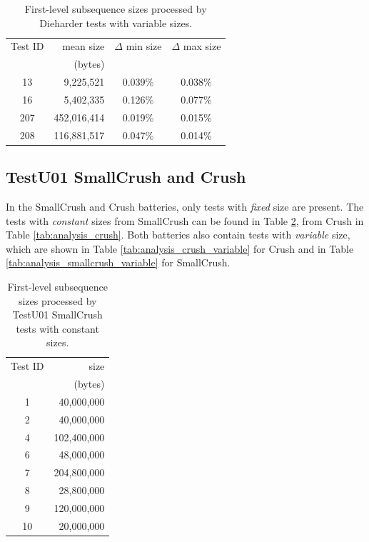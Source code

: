 \documentclass[
  digital,     %
  oneside,     %
  nosansbold,  %
  nocolorbold, %
  nolof,         %
  nolot,         %
]{fithesis4}
\begin{document}
\begin{table}[h]
  \begin{tabularx}{0.7\textwidth}{c|r|c|c}
    Test ID & mean size & $\Delta$ min size & $\Delta$ max size\\
     & (bytes) & & \\
    \midrule
    13 & 9,225,521 & 0.039\% & 0.038\%\\
    16 & 5,402,335 & 0.126\% & 0.077\%\\
    207 & 452,016,414 & 0.019\% & 0.015\%\\
    208 & 116,881,517 & 0.047\% & 0.014\%\\
 
  \end{tabularx}
  \caption{First-level subsequence sizes processed by Dieharder tests with variable sizes.}
  \label{tab:analysis_dieharder_variable}
\end{table}



\subsection{TestU01 SmallCrush and Crush}
In the SmallCrush and Crush batteries, only tests with \emph{fixed} size are present. The tests with \emph{constant} sizes from SmallCrush can be found in Table \ref{tab:analysis_smallcrush}, from Crush in Table \ref{tab:analysis_crush}. Both batteries also contain tests with \emph{variable} size, which are shown in Table \ref{tab:analysis_crush_variable} for Crush and in Table \ref{tab:analysis_smallcrush_variable} for SmallCrush. 

\begin{table}[h]
  \begin{tabularx}{0.36\textwidth}{c|r}
  Test ID & size \\
    & (bytes) \\
  \midrule
    1 & 40,000,000 \\
    2 & 40,000,000 \\
    4 & 102,400,000 \\
    6 & 48,000,000 \\
    7 & 204,800,000 \\
    8 & 28,800,000 \\
    9 & 120,000,000 \\
    10 & 20,000,000 \\

  \end{tabularx}
  \caption{
  First-level subsequence sizes processed by TestU01 SmallCrush tests with constant sizes.}
  \label{tab:analysis_smallcrush}
\end{table}
\end{document}
